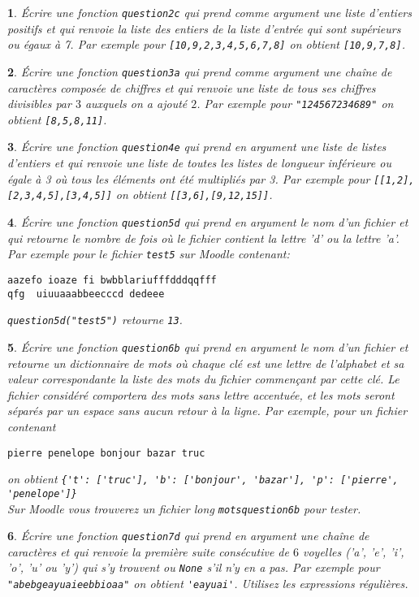 \documentclass[10pt]{article}
\newtheorem{exi}{}
\newenvironment{exo}{\begin{exi}\em}{\end{exi}}
\begin{document}
\begin{exo}
    Écrire une fonction {\tt question2c} qui prend comme argument une liste d'entiers positifs et qui renvoie la liste des entiers de la liste d'entrée qui sont
supérieurs ou égaux à 7. Par exemple pour \verb+[10,9,2,3,4,5,6,7,8]+
on obtient \verb+[10,9,7,8]+.
\end{exo}
\begin{exo}
    Écrire une fonction {\tt question3a} qui prend comme argument une chaîne de
caractères composée de chiffres
et qui renvoie une liste de tous ses chiffres divisibles par $3$
auxquels on a ajouté $2$. Par
exemple pour \verb+"124567234689"+ on obtient \verb+[8,5,8,11]+.
\end{exo}
\begin{exo}
    Écrire une fonction {\tt question4e} qui prend en argument une liste de listes d'entiers et qui renvoie une liste de toutes les listes
de longueur inférieure ou égale à 3 où tous les éléments ont été multipliés par 3. Par exemple pour \verb+[[1,2],[2,3,4,5],[3,4,5]]+ on obtient \verb+[[3,6],[9,12,15]]+.
\end{exo}
\begin{exo}
    Écrire une fonction {\tt question5d} qui prend en argument le nom d'un fichier et qui retourne le nombre de fois où le fichier contient la lettre 'd' ou la
lettre 'a'.
Par exemple pour le fichier \verb+test5+ sur Moodle contenant: 
\begin{verbatim} 
aazefo ioaze fi bwbblariufffdddqqfff
qfg  uiuuaaabbeecccd dedeee
\end{verbatim} 
\verb+question5d("test5")+ retourne \verb+13+.
\end{exo}
\begin{exo}
    Écrire une fonction \verb+question6b+ qui prend en argument le nom d'un fichier
et retourne un dictionnaire de mots où chaque clé est une lettre de
l'alphabet et sa valeur correspondante la liste des mots du fichier commençant
par cette clé. Le fichier considéré comportera des mots sans lettre accentuée, et les mots seront séparés par un espace sans aucun retour
à la ligne.
Par exemple, pour un fichier contenant
\begin{verbatim}
pierre penelope bonjour bazar truc
\end{verbatim}
on obtient \verb+{'t': ['truc'], 'b': ['bonjour', 'bazar'], 'p': ['pierre', 'penelope']}+\\
Sur Moodle vous trouverez un fichier long \verb+motsquestion6b+ pour tester.
\end{exo}
\begin{exo}
    Écrire une fonction {\tt question7d}
qui prend en argument une chaîne de caractères et qui renvoie
la première suite consécutive de $6$ voyelles ('a', 'e', 'i', 'o', 'u' ou 'y')
qui s'y trouvent ou \verb+None+
s'il n'y en a pas.
Par exemple pour \verb+"abebgeayuaieebbioaa"+ on obtient
\verb+'eayuai'+. Utilisez les expressions régulières.
\end{exo}
\end{document}
